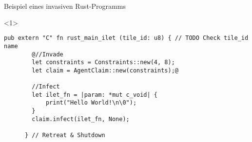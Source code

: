 

\lstset{showstringspaces=true,columns=fullflexible,keepspaces=true}

\begin{frame}[fragile]{Beispiel eines invasiven Rust-Programms}

  \begin{onlyenv}<1> {
    \begin{lstlisting}[frame=single,style=base]
      pub extern "C" fn rust_main_ilet (tile_id: u8) { // TODO Check tile_id name
        @//Invade
        let constraints = Constraints::new(4, 8);
        let claim = AgentClaim::new(constraints);@

        //Infect
        let ilet_fn = |param: *mut c_void| {
            print("Hello World!\n\0");
        }
        claim.infect(ilet_fn, None);

      } // Retreat & Shutdown
    \end{lstlisting}
  }
  \end{onlyenv}

\end{frame}
